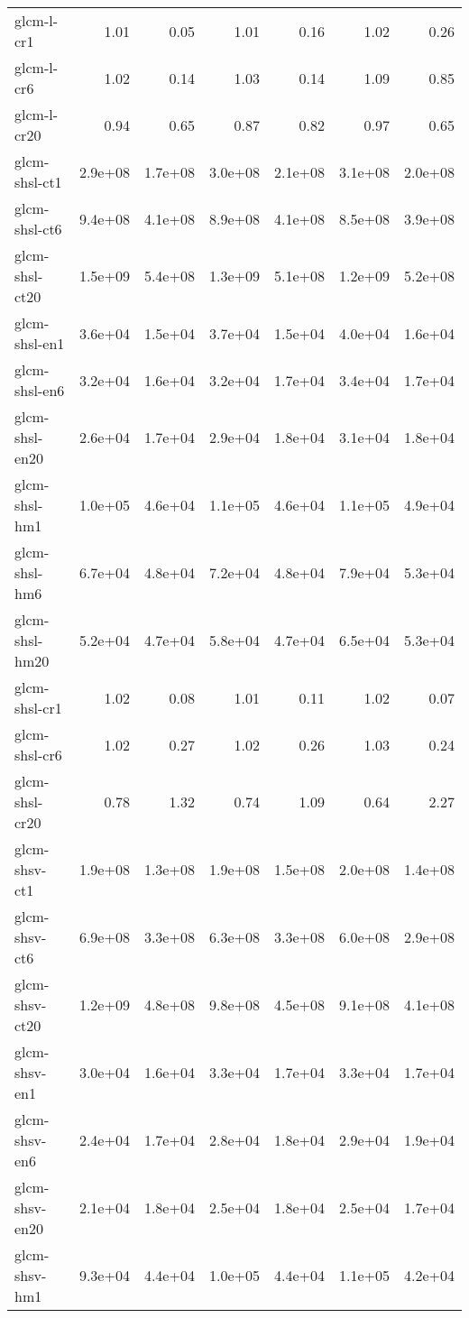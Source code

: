 \begin{tabular}{lrrrrrr}
glcm-l-cr1          &    1.01 &    0.05 &    1.01 &    0.16 &    1.02 &    0.26 \\
glcm-l-cr6          &    1.02 &    0.14 &    1.03 &    0.14 &    1.09 &    0.85 \\
glcm-l-cr20         &    0.94 &    0.65 &    0.87 &    0.82 &    0.97 &    0.65 \\
glcm-shsl-ct1       & 2.9e+08 & 1.7e+08 & 3.0e+08 & 2.1e+08 & 3.1e+08 & 2.0e+08 \\
glcm-shsl-ct6       & 9.4e+08 & 4.1e+08 & 8.9e+08 & 4.1e+08 & 8.5e+08 & 3.9e+08 \\
glcm-shsl-ct20      & 1.5e+09 & 5.4e+08 & 1.3e+09 & 5.1e+08 & 1.2e+09 & 5.2e+08 \\
glcm-shsl-en1       & 3.6e+04 & 1.5e+04 & 3.7e+04 & 1.5e+04 & 4.0e+04 & 1.6e+04 \\
glcm-shsl-en6       & 3.2e+04 & 1.6e+04 & 3.2e+04 & 1.7e+04 & 3.4e+04 & 1.7e+04 \\
glcm-shsl-en20      & 2.6e+04 & 1.7e+04 & 2.9e+04 & 1.8e+04 & 3.1e+04 & 1.8e+04 \\
glcm-shsl-hm1       & 1.0e+05 & 4.6e+04 & 1.1e+05 & 4.6e+04 & 1.1e+05 & 4.9e+04 \\
glcm-shsl-hm6       & 6.7e+04 & 4.8e+04 & 7.2e+04 & 4.8e+04 & 7.9e+04 & 5.3e+04 \\
glcm-shsl-hm20      & 5.2e+04 & 4.7e+04 & 5.8e+04 & 4.7e+04 & 6.5e+04 & 5.3e+04 \\
glcm-shsl-cr1       &    1.02 &    0.08 &    1.01 &    0.11 &    1.02 &    0.07 \\
glcm-shsl-cr6       &    1.02 &    0.27 &    1.02 &    0.26 &    1.03 &    0.24 \\
glcm-shsl-cr20      &    0.78 &    1.32 &    0.74 &    1.09 &    0.64 &    2.27 \\
glcm-shsv-ct1       & 1.9e+08 & 1.3e+08 & 1.9e+08 & 1.5e+08 & 2.0e+08 & 1.4e+08 \\
glcm-shsv-ct6       & 6.9e+08 & 3.3e+08 & 6.3e+08 & 3.3e+08 & 6.0e+08 & 2.9e+08 \\
glcm-shsv-ct20      & 1.2e+09 & 4.8e+08 & 9.8e+08 & 4.5e+08 & 9.1e+08 & 4.1e+08 \\
glcm-shsv-en1       & 3.0e+04 & 1.6e+04 & 3.3e+04 & 1.7e+04 & 3.3e+04 & 1.7e+04 \\
glcm-shsv-en6       & 2.4e+04 & 1.7e+04 & 2.8e+04 & 1.8e+04 & 2.9e+04 & 1.9e+04 \\
glcm-shsv-en20      & 2.1e+04 & 1.8e+04 & 2.5e+04 & 1.8e+04 & 2.5e+04 & 1.7e+04 \\
glcm-shsv-hm1       & 9.3e+04 & 4.4e+04 & 1.0e+05 & 4.4e+04 & 1.1e+05 & 4.2e+04 \\

\end{tabular}
